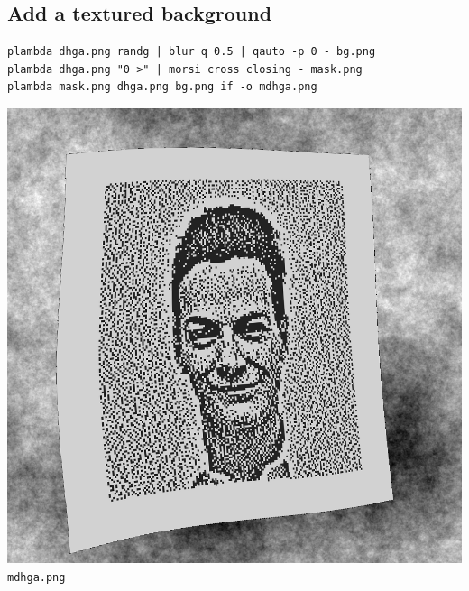 \subsection{Add a textured background}
\begin{verbatim}
plambda dhga.png randg | blur q 0.5 | qauto -p 0 - bg.png
plambda dhga.png "0 >" | morsi cross closing - mask.png
plambda mask.png dhga.png bg.png if -o mdhga.png
\end{verbatim}
\includegraphics{mdhga.png}\verb+mdhga.png+

